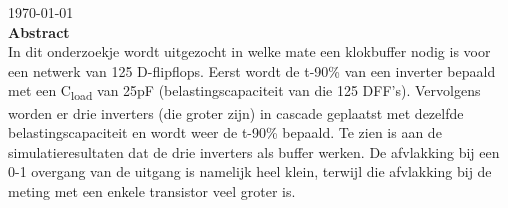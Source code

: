 \documentclass[12pt]{article}
\newcommand{\tss}{\textsubscript}
\begin{document}
\begin{titlepage}


{\large \today}\\[3cm] %


 
% 

\textbf{Abstract} \\
In dit onderzoekje wordt uitgezocht in welke mate een klokbuffer nodig is voor een netwerk van 125 D-flipflops. Eerst wordt de t-90\% van een inverter bepaald met een C\tss{load} van 25pF (belastingscapaciteit van die 125 DFF's). Vervolgens worden er drie inverters (die groter zijn)  in cascade geplaatst met dezelfde belastingscapaciteit en wordt weer de t-90\% bepaald. Te zien is aan de simulatieresultaten dat de drie inverters als buffer werken. De afvlakking bij een 0-1 overgang van de uitgang is namelijk heel klein, terwijl die afvlakking bij de meting met een enkele transistor veel groter is. 

\vfill %

\end{titlepage}
\end{document}
